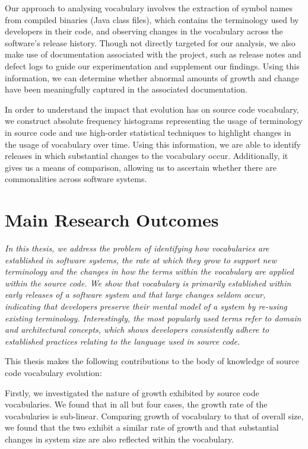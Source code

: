Our approach to analysing vocabulary involves the extraction of symbol names from compiled binaries (Java class files), which contains the terminology used by developers in their code, and observing changes in the vocabulary across the software's release history. Though not directly targeted for our analysis, we also make use of documentation associated with the project, such as release notes and defect logs to guide our experimentation and supplement our findings. Using this information, we can determine whether abnormal amounts of growth and change have been meaningfully captured in the associated documentation.

In order to understand the impact that evolution has on source code vocabulary, we construct absolute frequency histograms representing the usage of terminology in source code and use high-order statistical techniques to highlight changes in the usage of vocabulary over time. Using this information, we are able to identify releases in which substantial changes to the vocabulary occur. Additionally, it gives us a means of comparison, allowing us to ascertain whether there are commonalities across software systems.


\section{Main Research Outcomes} %
\label{sec:main_research_outcomes}

\emph{In this thesis, we address the problem of identifying how vocabularies are established in software systems, the rate at which they grow to support new terminology and the changes in how the terms within the vocabulary are applied within the source code. We show that vocabulary is primarily established within early releases of a software system and that large changes seldom occur, indicating that developers preserve their mental model of a system by re-using existing terminology. Interestingly, the most popularly used terms refer to domain and architectural concepts, which shows developers consistently adhere to established practices relating to the language used in source code.}

This thesis makes the following contributions to the body of knowledge of source code vocabulary evolution:

Firstly, we investigated the nature of growth exhibited by source code vocabularies. We found that in all but four cases, the growth rate of the vocabularies is sub-linear. Comparing growth of vocabulary to that of overall size, we found that the two exhibit a similar rate of growth and that substantial changes in system size are also reflected within the vocabulary.

